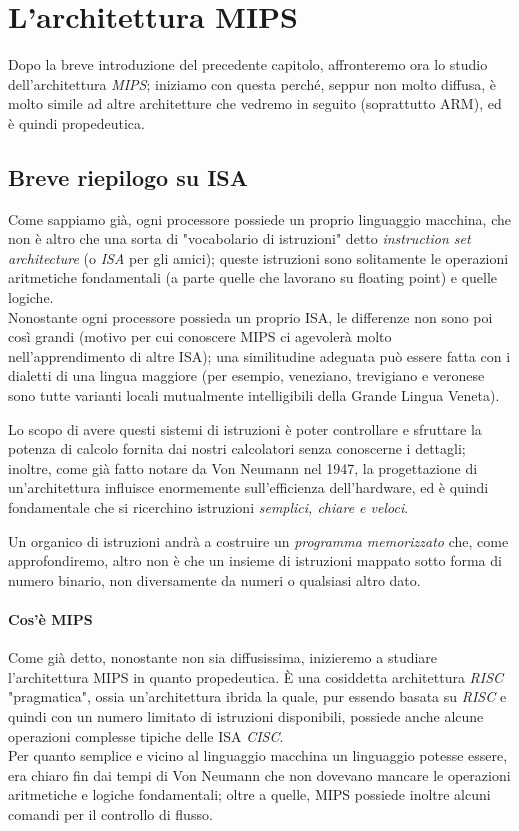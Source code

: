 \documentclass[class=book, crop=false]{standalone}
\begin{document}
\chapter{L'architettura MIPS}

Dopo la breve introduzione del precedente capitolo, affronteremo ora lo studio dell'architettura \emph{MIPS}; iniziamo con questa perché, seppur non molto diffusa, è molto simile ad altre architetture che vedremo in seguito (soprattutto ARM), ed è quindi propedeutica.

\section{Breve riepilogo su ISA}
Come sappiamo già, ogni processore possiede un proprio linguaggio macchina, che non è altro che una sorta di "vocabolario di istruzioni" detto \emph{instruction set architecture} (o \emph{ISA} per gli amici); queste istruzioni sono solitamente le operazioni aritmetiche fondamentali (a parte quelle che lavorano su floating point) e quelle logiche.\\
Nonostante ogni processore possieda un proprio ISA, le differenze non sono poi così grandi (motivo per cui conoscere MIPS ci agevolerà molto nell'apprendimento di altre ISA); una similitudine adeguata può essere fatta con i dialetti di una lingua maggiore (per esempio, veneziano, trevigiano e veronese sono tutte varianti locali mutualmente intelligibili della Grande Lingua Veneta).

Lo scopo di avere questi sistemi di istruzioni è poter controllare e sfruttare la potenza di calcolo fornita dai nostri calcolatori senza conoscerne i dettagli; inoltre, come già fatto notare da Von Neumann nel 1947, la progettazione di un'architettura influisce enormemente sull'efficienza dell'hardware, ed è quindi fondamentale che si ricerchino istruzioni \emph{semplici, chiare e veloci}.

Un organico di istruzioni andrà a costruire un \emph{programma memorizzato} che, come approfondiremo, altro non è che un insieme di istruzioni mappato sotto forma di numero binario, non diversamente da numeri o qualsiasi altro dato.

\subsubsection{Cos'è MIPS}
Come già detto, nonostante non sia diffusissima, inizieremo a studiare l'architettura MIPS in quanto propedeutica. È una cosiddetta architettura \emph{RISC} "pragmatica", ossia un'architettura ibrida la quale, pur essendo basata su \emph{RISC} e quindi con un numero limitato di istruzioni disponibili, possiede anche alcune operazioni complesse tipiche delle ISA \emph{CISC}.\\
Per quanto semplice e vicino al linguaggio macchina un linguaggio potesse essere, era chiaro fin dai tempi di Von Neumann che non dovevano mancare le operazioni aritmetiche e logiche fondamentali; oltre a quelle, MIPS possiede inoltre alcuni comandi per il controllo di flusso.
\end{document}
